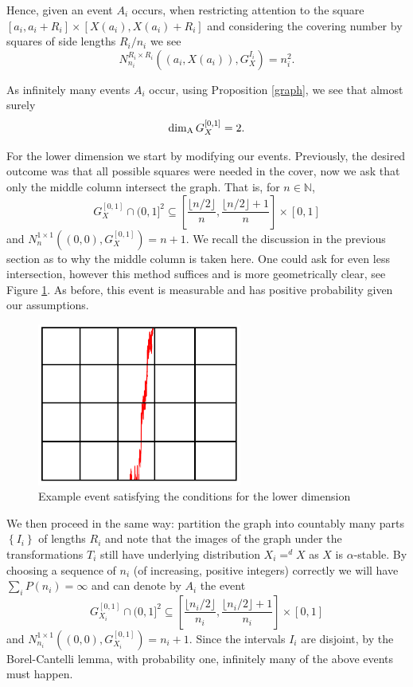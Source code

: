 Hence, given an event $A_i$ occurs, when restricting attention to the square $[a_i, a_i + R_i] \times [X(a_i), X(a_i)+R_i]$ and considering the covering number by squares of side lengths $R_i/n_i$ we see
\[
N_{n_i}^{R_i \times R_i }\left((a_i,X(a_i)),G_{X}^{I_i}\right)=n_i^2.
\]

As infinitely many events $A_i$ occur, using Proposition \ref{graph}, we see that almost surely
\[
\dim_{\textup{A}} G_{X}^{[0,1]}=2.
\]


For the lower dimension we start by modifying our events. Previously, the desired outcome was that all possible squares were needed in the cover, now we ask that only the middle column intersect the graph. That is, for $n\in \mathbb{N}$,
$$G_{X}^{[0,1]} \cap (0,1]^2 \subseteq \left[\frac{\lfloor n/2 \rfloor}{n} ,  \frac{\lfloor n/2 \rfloor + 1}{n} \right] \times [0,1]$$
and $N_{n}^{1\times 1}((0,0),G_X^{[0,1]}) = n + 1$. We recall the discussion in the previous section as to why the middle column is taken here. One could ask for even less intersection, however this method suffices and is more geometrically clear, see Figure \ref{fig:rectangles-graph2}. As before, this event is measurable and has positive probability given our assumptions.

\begin{figure}[h]
    \centering
    \includegraphics[width=0.6\textwidth]{pics/ch-brownian/rectangles-graph2.png}
    \caption{Example event satisfying the conditions for the lower dimension}
    \label{fig:rectangles-graph2}
\end{figure}


We then proceed in the same way: partition the graph into countably many parts $\left\{I_i \right\}$ of lengths $R_i$ and note that the images of the graph under the transformations $T_i$ still have underlying distribution $X_i =^d X$ as $X$ is $\alpha$-stable. By choosing a sequence of $n_i$ (of increasing, positive integers) correctly we will have $\sum_{i}P(n_i) = \infty$ and can denote by $A_i$ the event 
$$G_{X_i}^{[0,1]} \cap (0,1]^2 \subseteq \left[\frac{\lfloor n_i/2 \rfloor}{n_i} ,  \frac{\lfloor n_i/2 \rfloor + 1}{n_i} \right] \times [0,1]$$
and $N_{n_i}^{1\times 1}((0,0),G_{X_i}^{[0,1]}) = n_i + 1$. Since the intervals $I_i$ are disjoint, by the Borel-Cantelli lemma, with probability one, infinitely many of the above events must happen.

